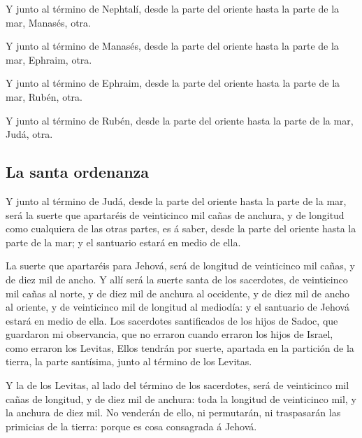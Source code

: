  Y junto al término de Nephtalí, desde la parte del
oriente hasta la parte de la mar, Manasés, otra.

 Y junto al término de Manasés, desde la parte del oriente
hasta la parte de la mar, Ephraim, otra.

 Y junto al término de Ephraim, desde la parte del oriente
hasta la parte de la mar, Rubén, otra.

 Y junto al término de Rubén, desde la parte del oriente
hasta la parte de la mar, Judá, otra.

\hypertarget{la-santa-ordenanza}{%
\subsection{La santa ordenanza}\label{la-santa-ordenanza}}

 Y junto al término de Judá, desde la parte del oriente
hasta la parte de la mar, será la suerte que apartaréis de veinticinco
mil cañas de anchura, y de longitud como cualquiera de las otras partes,
es á saber, desde la parte del oriente hasta la parte de la mar; y el
santuario estará en medio de ella.

 La suerte que apartaréis para Jehová, será de longitud de
veinticinco mil cañas, y de diez mil de ancho.  Y allí
será la suerte santa de los sacerdotes, de veinticinco mil cañas al
norte, y de diez mil de anchura al occidente, y de diez mil de ancho al
oriente, y de veinticinco mil de longitud al mediodía: y el santuario de
Jehová estará en medio de ella.  Los sacerdotes
santificados de los hijos de Sadoc, que guardaron mi observancia, que no
erraron cuando erraron los hijos de Israel, como erraron los Levitas,
 Ellos tendrán por suerte, apartada en la partición de la
tierra, la parte santísima, junto al término de los Levitas.

 Y la de los Levitas, al lado del término de los
sacerdotes, será de veinticinco mil cañas de longitud, y de diez mil de
anchura: toda la longitud de veinticinco mil, y la anchura de diez mil.
 No venderán de ello, ni permutarán, ni traspasarán las
primicias de la tierra: porque es cosa consagrada á Jehová.


